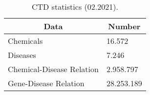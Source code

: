 \begin{table}
\caption{CTD statistics (02.2021).}
\centering
\begin{tabular}{|l|l|}
\hline
\multicolumn{1}{|c|}{\textbf{Data}} & \multicolumn{1}{c|}{\textbf{Number}} \\ \hline
Chemicals                  & 16.572                      \\ \hline
Diseases                   & 7.246                       \\ \hline
Chemical-Disease Relation  & 2.958.797                   \\ \hline
Gene-Disease Relation      & 28.253.189                  \\ \hline
\end{tabular}
\label{tab:ctd_stats}
\end{table}
